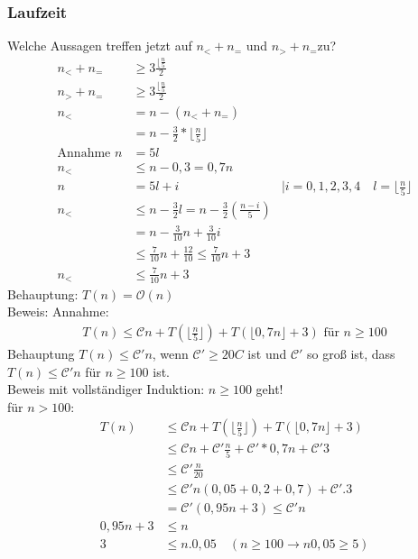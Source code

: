 \subsubsection{Laufzeit}
Welche Aussagen treffen jetzt auf $n_<+n_=$ und $n_> + n_=$zu?
\begin{align*}
n_< + n_= &\geq 3\frac{\lfloor \frac{n}{5}}{2}\\
n_> + n_= &\geq 3\frac{\lfloor \frac{n}{5}}{2}\\
n_< &= n-(n_< + n_=)\\
&= n- \frac{3}{2} * \lfloor \frac{n}{5} \rfloor\\
\text{Annahme } n&=5l\\
n_< & \leq n - 0,3 = 0,7n\\
n &= 5l + i &| i = 0,1,2,3,4 \quad l = \lfloor \frac{n}{5} \rfloor\\
n_< &\leq n-\frac{3}{2}l = n-\frac{3}{2}(\frac{n-i}{5})\\
&=n-\frac{3}{10}n + \frac{3}{10}i\\
&\leq \frac{7}{10}n + \frac{12}{10} \leq \frac{7}{10}n+3\\
n_< &\leq \frac{7}{10	}n+3
\end{align*}
Behauptung: $T(n) = \mathcal{O}(n)$\\
Beweis: Annahme:
\begin{align*}
T(n) \leq \mathcal{C}n+T(\lfloor \frac{n}{5} \rfloor) + T(\lfloor 0,7n \rfloor + 3) \text{ für } n \geq 100
\end{align*}
Behauptung $T(n) \leq \mathcal{C}'n$, wenn $\mathcal{C}'\geq 20C$ ist und $\mathcal{C}'$ so groß ist, dass $T(n) \leq \mathcal{C}'n$ für $n \geq 100$ ist.\\
Beweis mit vollständiger Induktion: $n \geq 100$ geht!\\
für $n > 100$:
\begin{align*}
T(n) &\leq \mathcal{C} n + T(\lfloor \frac{n}{5} \rfloor) + T(\lfloor 0,7n \rfloor+3)\\
&\leq \mathcal{C}n + \mathcal{C}' \frac{n}{5} + \mathcal{C}' * 0,7n + \mathcal{C}'3\\
&\leq \mathcal{C'}\frac{n}{20}\\
&\leq \mathcal{C}'n(0,05 + 0,2 + 0,7) + \mathcal{C'}.3\\
&=\mathcal{C}'(0,95n + 3) \leq \mathcal{C}'n\\
0,95n + 3 &\leq n\\
3 &\leq n.0,05 \quad (n \geq 100 \rightarrow n0,05 \geq 5)\\
\end{align*}